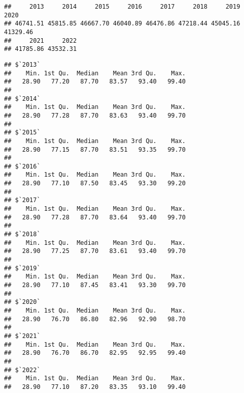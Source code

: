 \documentclass[
]{article}
\newenvironment{Shaded}{\begin{snugshade}}{\end{snugshade}}
\newcommand{\AttributeTok}[1]{\textcolor[rgb]{0.13,0.29,0.53}{#1}}
\newcommand{\ConstantTok}[1]{\textcolor[rgb]{0.56,0.35,0.01}{#1}}
\newcommand{\FunctionTok}[1]{\textcolor[rgb]{0.13,0.29,0.53}{\textbf{#1}}}
\newcommand{\NormalTok}[1]{#1}
\newcommand{\SpecialCharTok}[1]{\textcolor[rgb]{0.81,0.36,0.00}{\textbf{#1}}}
\begin{document}
\begin{Shaded}
\end{Shaded}

\begin{verbatim}
##     2013     2014     2015     2016     2017     2018     2019     2020 
## 46741.51 45815.85 46667.70 46040.89 46476.86 47218.44 45045.16 41329.46 
##     2021     2022 
## 41785.86 43532.31
\end{verbatim}

\begin{Shaded}
\end{Shaded}

\begin{verbatim}
## $`2013`
##    Min. 1st Qu.  Median    Mean 3rd Qu.    Max. 
##   28.90   77.20   87.70   83.57   93.40   99.40 
## 
## $`2014`
##    Min. 1st Qu.  Median    Mean 3rd Qu.    Max. 
##   28.90   77.28   87.70   83.63   93.40   99.70 
## 
## $`2015`
##    Min. 1st Qu.  Median    Mean 3rd Qu.    Max. 
##   28.90   77.15   87.70   83.51   93.35   99.70 
## 
## $`2016`
##    Min. 1st Qu.  Median    Mean 3rd Qu.    Max. 
##   28.90   77.10   87.50   83.45   93.30   99.20 
## 
## $`2017`
##    Min. 1st Qu.  Median    Mean 3rd Qu.    Max. 
##   28.90   77.28   87.70   83.64   93.40   99.70 
## 
## $`2018`
##    Min. 1st Qu.  Median    Mean 3rd Qu.    Max. 
##   28.90   77.25   87.70   83.61   93.40   99.70 
## 
## $`2019`
##    Min. 1st Qu.  Median    Mean 3rd Qu.    Max. 
##   28.90   77.10   87.45   83.41   93.30   99.70 
## 
## $`2020`
##    Min. 1st Qu.  Median    Mean 3rd Qu.    Max. 
##   28.90   76.70   86.80   82.96   92.90   98.70 
## 
## $`2021`
##    Min. 1st Qu.  Median    Mean 3rd Qu.    Max. 
##   28.90   76.70   86.70   82.95   92.95   99.40 
## 
## $`2022`
##    Min. 1st Qu.  Median    Mean 3rd Qu.    Max. 
##   28.90   77.10   87.20   83.35   93.10   99.40
\end{verbatim}
\end{document}
